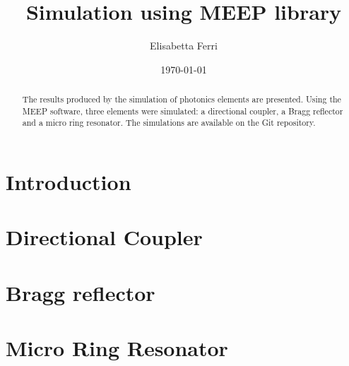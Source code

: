 \documentclass[a4paper]{article}
\title{Simulation using MEEP library}
\author{Elisabetta Ferri}
\date{\today}
\begin{document}
\maketitle
 
\begin{abstract}

The results produced by the simulation of photonics elements are presented. Using the MEEP software, three elements were simulated: a directional coupler, a Bragg reflector and a micro ring resonator. The simulations are available on the Git repository\cite{Git_repo}.

\end{abstract}

\section{Introduction}


\section{Directional Coupler}


\section{Bragg reflector}


\section{Micro Ring Resonator}


\printbibliography
\end{document}
